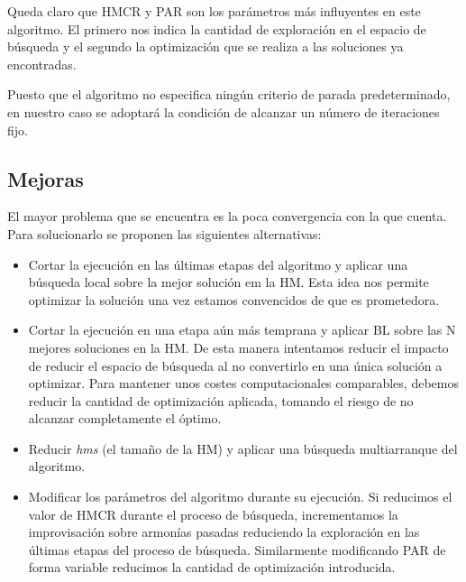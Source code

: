 \vspace{\baselineskip}

Queda claro que HMCR y PAR son los parámetros más influyentes en este algoritmo. El primero nos indica la cantidad de exploración en el espacio de búsqueda y el segundo la optimización que se realiza a las soluciones ya encontradas.

\vspace{\baselineskip}

Puesto que el algoritmo no especifica ningún criterio de parada predeterminado, en nuestro caso se adoptará la condición de alcanzar un número de iteraciones fijo.


\subsection{Mejoras}

El mayor problema que se encuentra es la poca convergencia con la que cuenta. Para solucionarlo se proponen las siguientes alternativas:

\begin{itemize}
    \item Cortar la ejecución en las últimas etapas del algoritmo y aplicar una búsqueda local sobre la mejor solución em la HM. Esta idea nos permite optimizar la solución una vez estamos convencidos de que es prometedora.
    \item Cortar la ejecución en una etapa aún más temprana y aplicar BL sobre las N mejores soluciones en la HM. De esta manera intentamos reducir el impacto de reducir el espacio de búsqueda al no convertirlo en una única solución a optimizar. Para mantener unos costes computacionales comparables, debemos reducir la cantidad de optimización aplicada, tomando el riesgo de no alcanzar completamente el óptimo.
    \item Reducir \textit{hms} (el tamaño de la HM) y aplicar una búsqueda multiarranque del algoritmo.
    \item Modificar los parámetros del algoritmo durante su ejecución. Si reducimos el valor de HMCR durante el proceso de búsqueda, incrementamos la improvisación sobre armonías pasadas reduciendo la exploración en las últimas etapas del proceso de búsqueda. Similarmente modificando PAR de forma variable reducimos la cantidad de optimización introducida. 
\end{itemize}
